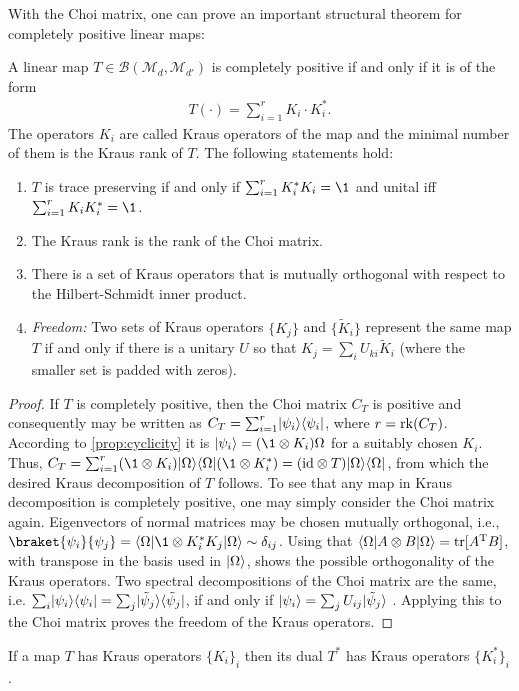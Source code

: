 With the Choi matrix, one can prove an important structural theorem for completely positive linear maps:
\begin{theorem}\label{thm:kraus}
A linear map $T \in \mathcal{B}(\mathcal{M}_d, \mathcal{M}_{d'})$ is completely positive if and only if it is of the form
\begin{align*}
    T(\cdot) = \sum_{i=1}^r K_i \cdot K_i^*.
\end{align*}
The operators $K_i$ are called Kraus operators of the map and the minimal number of them is the Kraus rank of $T$. The following statements hold:
\begin{enumerate}
    \item $T$ is trace preserving if and only if $\sum_{i=1}^r K_i^*K_i = \1$ and unital iff $\sum_{i=1}^r K_iK_i ^*= \1$.
    
    \item The Kraus rank is the rank of the Choi matrix.
    
    \item There is a set of Kraus operators that is mutually orthogonal with respect to the Hilbert-Schmidt inner product.
    
    \item \textit{Freedom:} Two sets of Kraus operators $\{K_j\}$ and $\{\tilde{K}_i\}$ represent the same map $T$ if and only if there is a unitary $U$ so that $K_j = \sum_i U_{ki}\tilde{K}_i$ (where the smaller set is padded with zeros).
\end{enumerate}
\end{theorem}

\begin{proof}
If $T$ is completely positive, then the Choi matrix $C_T$ is positive and consequently may be written as $C_T = \sum_{i=1}^r \lvert\psi_i\rangle\langle\psi_i\rvert$, where $r = \mathrm{rk}(C_T)$. According to \ref{prop:cyclicity} it is $\ket  {\psi_i} = (\1\otimes K_i)\Omega$ for a suitably chosen $K_i$. Thus, $C_T = \sum_{i=1}^r (\1\otimes K_i)\pr \Omega (\1 \otimes K_i^*) = (\id \otimes T)\pr \Omega$, from which the desired Kraus decomposition of $T$ follows. To see that any map in Kraus decomposition is completely positive, one may simply consider the Choi matrix again. Eigenvectors of normal matrices may be chosen mutually orthogonal, i.e., $\braket{\psi_i}{\psi_j} = \bra\Omega \1\otimes K_i^*K_j  \ket \Omega \sim \delta_{ij}$. Using that $\langle\Omega\rvert A\otimes B\lvert\Omega\rangle=\mathrm{tr}[A^\text T B]$, with transpose in the basis used in $\lvert\Omega\rangle$, shows the possible orthogonality of the Kraus operators. Two spectral decompositions of the Choi matrix are the same, i.e. $\sum_i \lvert\psi_i\rangle\langle\psi_i\rvert = \sum_j \lvert\tilde{\psi}_j\rangle\langle\tilde{\psi}_j\rvert$, if and only if $\lvert\psi_i\rangle = \sum_jU_{ij} \lvert\tilde\psi_j\rangle$ \cite{Hughston1993}. Applying this to the Choi matrix proves the freedom of the Kraus operators.
\end{proof}\noindent
If a map $T$ has Kraus operators $\{K_i\}_i$ then its dual $T^*$ has Kraus operators $\{K_i^*\}_i$.

